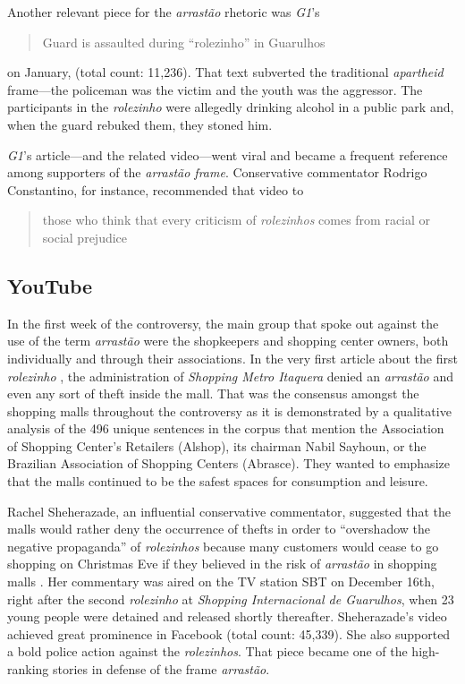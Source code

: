 Another relevant piece for the \emph{arrastão} rhetoric was \emph{G1}'s \blockcquote{g1_guardaespancado}{Guard is assaulted during \enquote{rolezinho} in Guarulhos} on January,  (total count: 11,236). That text subverted the traditional \emph{apartheid} frame---the policeman was the victim and the youth was the aggressor. The participants in the \emph{rolezinho} were allegedly drinking alcohol in a public park and, when the guard rebuked them, they stoned him.

\emph{G1}'s article---and the related video---went viral and became a frequent reference among supporters of the \emph{arrastão frame}. Conservative commentator Rodrigo Constantino, for instance, recommended that video to \blockcquote{constantino_comportamental}[.]{those who think that every criticism of \emph{rolezinhos} comes from racial or social prejudice}

\subsection*{YouTube}
\label{sub:youtube}

In the first week of the controversy, the main group that spoke out against the use of the term \emph{arrastão} were the shopkeepers and shopping center owners, both individually and through their associations. In the very first article about the first \emph{rolezinho} \autocite{band_arrastao_itaquera}, the administration of \emph{Shopping Metro Itaquera} denied an \emph{arrastão} and even any sort of theft inside the mall. That was the consensus amongst the shopping malls throughout the controversy as it is demonstrated by a qualitative analysis of the 496 unique sentences in the corpus that mention the Association of Shopping Center's Retailers (Alshop), its chairman Nabil Sayhoun, or the Brazilian Association of Shopping Centers (Abrasce). They wanted to emphasize that the malls continued to be the safest spaces for consumption and leisure.

Rachel Sheherazade, an influential conservative commentator, suggested that the malls would rather deny the occurrence of thefts in order to \enquote{overshadow the negative propaganda} of \emph{rolezinhos} because many customers would cease to go shopping on Christmas Eve if they believed in the risk of \emph{arrastão} in shopping malls \autocite{youtube_rachel}. Her commentary was aired on the TV station SBT on December 16th, right after the second \emph{rolezinho} at \emph{Shopping Internacional de Guarulhos}, when 23 young people were detained and released shortly thereafter. Sheherazade's video achieved great prominence in Facebook (total count: 45,339). She also supported a bold police action against the \emph{rolezinhos}. That piece became one of the high-ranking stories in defense of the frame \emph{arrastão}.

